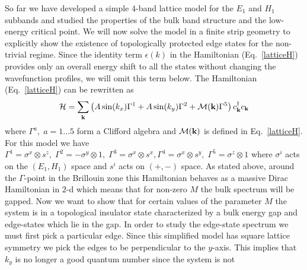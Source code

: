 \documentclass{article}
\begin{document}
So far we have developed a simple $4$-band lattice model for the
$E_1$ and $H_1$ subbands and studied the properties of the bulk band
structure and the low-energy critical point.  We will now solve the
model in a finite strip geometry to explicitly show the existence of
topologically protected edge states for the non-trivial regime.
Since the identity term $\epsilon(k)$ in the Hamiltonian
(Eq.~\ref{latticeH}) provides only an overall energy shift to all
the states without changing the wavefunction profiles, we will omit
this term below. The Hamiltonian (Eq.~\ref{latticeH}) can be
rewritten as
\begin{equation}
{\cal{H}}=\sum_{\textbf{k}}\left( A \sin (k_x)\Gamma^1 + A \sin
(k_y)\Gamma^2+{\cal{M}}(\textbf{k})\Gamma^5\right)c^{\dagger}_{\textbf{k}}c_{\textbf{k}}\end{equation}\noindent
where $\Gamma^a,\; a=1\ldots 5$ form a Clifford algebra and
${\cal{M}}(\textbf{k})$ is defined in Eq.~\ref{latticeH}. For this
model we have $\Gamma^1=\sigma^x\otimes
s^z,\;\Gamma^2=-\sigma^y\otimes 1,\;\Gamma^3=\sigma^x\otimes
s^x,\Gamma^4=\sigma^x\otimes s^y,\;\Gamma^5=\sigma^z\otimes 1$ where
$\sigma^i$ acts on the $(E_1,H_1)$ space and $s^i$ acts on $(+,-)$
space. As stated above, around the $\Gamma$-point in the Brillouin
zone this Hamiltonian behaves as a massive Dirac Hamiltonian in
$2$-d which means that for non-zero $M$ the bulk spectrum will be
gapped. Now we want to show that for certain values of the parameter
$M$ the system is in a topological insulator state characterized by
a bulk energy gap and edge-states which lie in the gap. In order to
study the edge-state spectrum we must first pick a particular edge.
Since this simplified model has square lattice symmetry we pick the
edges to be perpendicular to the $y$-axis. This implies that $k_y$
is no longer a good quantum number since the system is not
\end{document}
